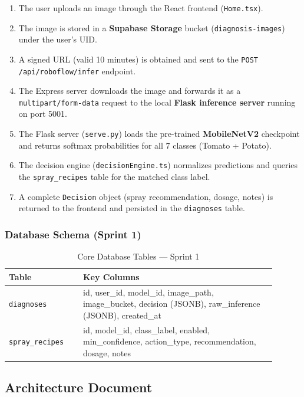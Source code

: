 \documentclass[12pt,a4paper]{report}
\begin{document}
\begin{enumerate}
  \item The user uploads an image through the React frontend (\texttt{Home.tsx}).
  \item The image is stored in a \textbf{Supabase Storage} bucket (\texttt{diagnosis-images}) under the user's UID.
  \item A signed URL (valid 10 minutes) is obtained and sent to the \texttt{POST /api/roboflow/infer} endpoint.
  \item The Express server downloads the image and forwards it as a \texttt{multipart/form-data} request to the local \textbf{Flask inference server} running on port 5001.
  \item The Flask server (\texttt{serve.py}) loads the pre-trained \textbf{MobileNetV2} checkpoint and returns softmax probabilities for all 7 classes (Tomato + Potato).
  \item The decision engine (\texttt{decisionEngine.ts}) normalizes predictions and queries the \texttt{spray\_recipes} table for the matched class label.
  \item A complete \texttt{Decision} object (spray recommendation, dosage, notes) is returned to the frontend and persisted in the \texttt{diagnoses} table.
\end{enumerate}

\subsubsection{Database Schema (Sprint 1)}
\begin{table}[H]
\centering
\caption{Core Database Tables — Sprint 1}
\begin{tabular}{p{0.25\linewidth} p{0.65\linewidth}}
\toprule
\textbf{Table} & \textbf{Key Columns} \\
\midrule
\texttt{diagnoses}      & id, user\_id, model\_id, image\_path, image\_bucket, decision (JSONB), raw\_inference (JSONB), created\_at \\
\texttt{spray\_recipes} & id, model\_id, class\_label, enabled, min\_confidence, action\_type, recommendation, dosage, notes \\
\bottomrule
\end{tabular}
\end{table}

\subsection{Architecture Document}
\end{document}

